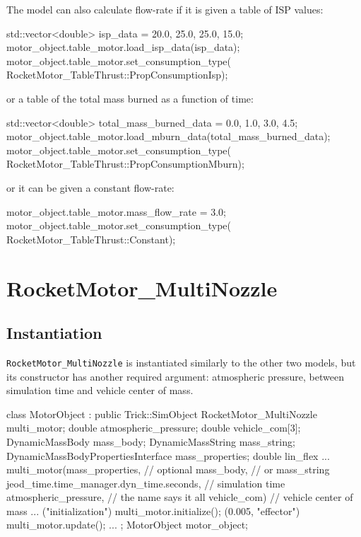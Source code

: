 \documentclass[11pt,fleqn]{report}
\begin{document}
\par The model can also calculate flow-rate if it is given a table of ISP values:
\begin{code}
std::vector<double> isp_data = {20.0, 25.0, 25.0, 15.0};
motor_object.table_motor.load_isp_data(isp_data);
motor_object.table_motor.set_consumption_type(
                  RocketMotor_TableThrust::PropConsumptionIsp);
\end{code}
or a table of the total mass burned as a function of time:
\begin{code}
std::vector<double> total_mass_burned_data = 
                                      {0.0, 1.0, 3.0, 4.5};
motor_object.table_motor.load_mburn_data(total_mass_burned_data);
motor_object.table_motor.set_consumption_type(
                  RocketMotor_TableThrust::PropConsumptionMburn);
\end{code}
or it can be given a constant flow-rate:
\begin{code}
motor_object.table_motor.mass_flow_rate = 3.0;
motor_object.table_motor.set_consumption_type(
                  RocketMotor_TableThrust::Constant);
\end{code}

\section{RocketMotor\_MultiNozzle}
\subsection{Instantiation}
\par \verb|RocketMotor_MultiNozzle| is instantiated similarly to the other two models, but its constructor has another required argument: atmospheric pressure, between simulation time and vehicle center of mass.
\begin{code}
class MotorObject : public Trick::SimObject {
  RocketMotor_MultiNozzle      multi_motor;
  double                       atmospheric_pressure;
  double                       vehicle_com[3];
  DynamicMassBody              mass_body;
  DynamicMassString            mass_string;
  DynamicMassBodyPropertiesInterface mass_properties;
  double                       lin_flex
...
  multi_motor(mass_properties, // optional
              mass_body, // or mass_string
              jeod_time.time_manager.dyn_time.seconds,
                         // simulation time
              atmospheric_pressure, // the name says it all
              vehicle_com)     // vehicle center of mass
...
    ("initialization")   multi_motor.initialize();
    (0.005, "effector")  multi_motor.update();
...
};
MotorObject motor_object;
\end{code}
\end{document}
